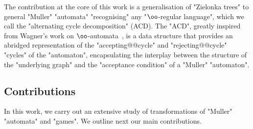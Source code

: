 \documentclass[10pt,a4paper]{amsart}
\begin{document}
The contribution at the core of this work is a generalisation of "Zielonka trees" to general "Muller" "automata" "recognising" any "$\oo$-regular language", which we call the "alternating cycle decomposition" (ACD). The "ACD", greatly inspired from Wagner's work on $\oo$-automata~\cite{Wagner1979omega}, is a data structure that provides an abridged representation of the "accepting@@cycle" and "rejecting@@cycle" "cycles" of the "automaton", encapsulating the interplay between the structure of the "underlying graph"  and the "acceptance condition" of a "Muller" "automaton".


\subsection*{Contributions}
In this work, we carry out an extensive study of transformations of "Muller" "automata" and "games". We outline next our main contributions.
\end{document}
